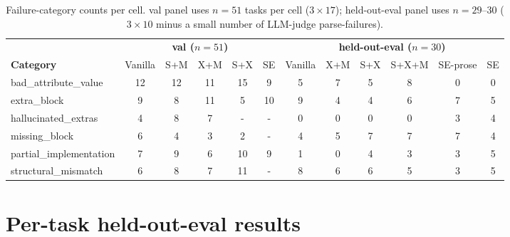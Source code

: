 \documentclass{article}
\begin{document}
\begin{table}[h]
  \caption{Failure-category counts per cell. val panel uses $n=51$ tasks per cell ($3{\times}17$); held-out-eval panel uses $n=29$--$30$ ($3{\times}10$ minus a small number of LLM-judge parse-failures).}
  \label{tab:bottleneck}
  \centering
  \footnotesize
  \begin{tabular}{l|ccccc|cccccc}
    \toprule
    & \multicolumn{5}{c|}{\textbf{val ($n=51$)}} & \multicolumn{6}{c}{\textbf{held-out-eval ($n=30$)}} \\
    \textbf{Category} & Vanilla & S+M & X+M & S+X & SE & Vanilla & X+M & S+X & S+X+M & SE-prose & SE \\
    \midrule
    bad\_attribute\_value     & 12 & 12 & 11 & 15 & 9  & 5 & 7 & 5 & 8 & 0 & 0 \\
    extra\_block              &  9 &  8 & 11 &  5 & 10 & 9 & 4 & 4 & 6 & 7 & 5 \\
    hallucinated\_extras      &  4 &  8 &  7 &  - &  - & 0 & 0 & 0 & 0 & 3 & 4 \\
    missing\_block            &  6 &  4 &  3 &  2 &  - & 4 & 5 & 7 & 7 & 7 & 4 \\
    partial\_implementation   &  7 &  9 &  6 & 10 &  9 & 1 & 0 & 4 & 3 & 3 & 5 \\
    structural\_mismatch      &  6 &  8 &  7 & 11 &  - & 8 & 6 & 6 & 5 & 3 & 5 \\
    \bottomrule
  \end{tabular}
\end{table}

\section{Per-task held-out-eval results}
\label{app:per-task}
\end{document}
